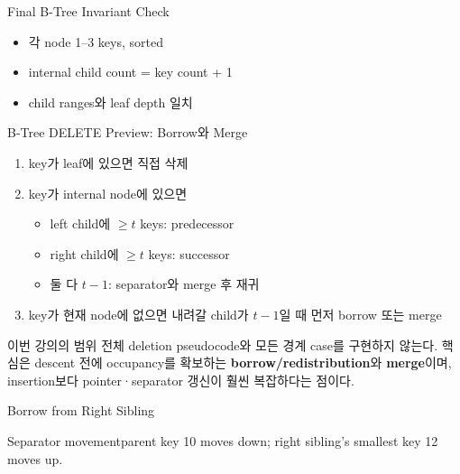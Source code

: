 \begin{frame}{Final B-Tree Invariant Check}
\centering{}
\begin{itemize}\item 각 node 1–3 keys, sorted\item internal child count = key count + 1\item child ranges와 leaf depth 일치\end{itemize}
\end{frame}
\begin{frame}{B-Tree DELETE Preview: Borrow와 Merge}
\scriptsize\begin{enumerate}
\item key가 leaf에 있으면 직접 삭제
\item key가 internal node에 있으면
  \begin{itemize}\scriptsize\item left child에 $\ge t$ keys: predecessor\item right child에 $\ge t$ keys: successor\item 둘 다 $t-1$: separator와 merge 후 재귀\end{itemize}
\item key가 현재 node에 없으면 내려갈 child가 $t-1$일 때 먼저 borrow 또는 merge
\end{enumerate}
\begin{alertblock}{이번 강의의 범위}
전체 deletion pseudocode와 모든 경계 case를 구현하지 않는다. 핵심은 descent 전에 occupancy를 확보하는 \textbf{borrow/redistribution}와 \textbf{merge}이며, insertion보다 pointer·separator 갱신이 훨씬 복잡하다는 점이다.
\end{alertblock}
\end{frame}
\begin{frame}{Borrow from Right Sibling}
\centering
{}
\begin{block}{Separator movement}parent key 10 moves down; right sibling's smallest key 12 moves up.\end{block}
\end{frame}
